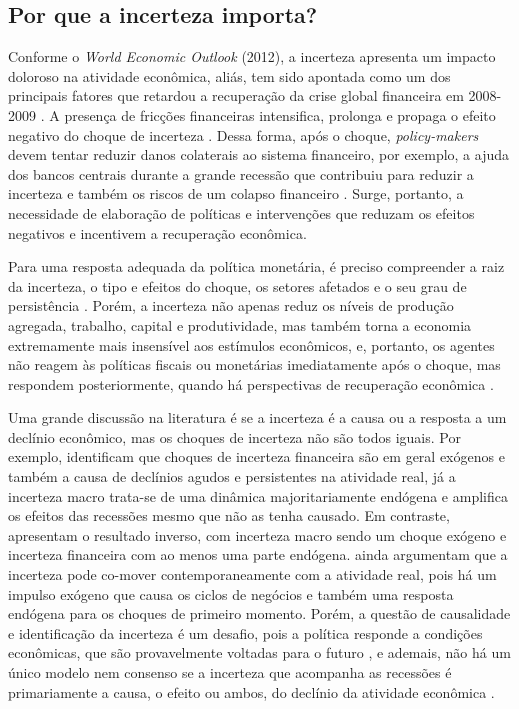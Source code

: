 \subsection{Por que a incerteza importa?}
Conforme o \textit{World Economic Outlook} (2012), a incerteza apresenta um impacto doloroso na atividade econômica, aliás, tem sido apontada como um dos principais fatores que retardou a recuperação da crise global financeira em 2008-2009 \cite{FMI2012outlook}. A presença de fricções financeiras intensifica, prolonga e propaga o efeito negativo do choque de incerteza \cite{alfaro2024friccao}. Dessa forma, após o choque, \textit{policy-makers} devem tentar reduzir danos colaterais ao sistema financeiro, por exemplo, a ajuda dos bancos centrais durante a grande recessão que contribuiu para reduzir a incerteza e também os riscos de um colapso financeiro \cite{bloom2017observations}. Surge, portanto, a necessidade de elaboração de políticas e intervenções que reduzam os efeitos negativos e incentivem a recuperação econômica. 
\par

Para uma resposta adequada da política monetária, é preciso compreender a raiz da incerteza, o tipo e efeitos do choque, os setores afetados e o seu grau de persistência \cite{haddow2013macroeconomic}. Porém, a incerteza não apenas reduz os níveis de produção agregada, trabalho, capital e produtividade, mas também torna a economia extremamente mais insensível aos estímulos econômicos, e, portanto, os agentes não reagem às políticas fiscais ou monetárias imediatamente após o choque, mas respondem posteriormente, quando há perspectivas de recuperação econômica \cite{bloom2009impact}.
\par

Uma grande discussão na literatura é se a incerteza é a causa ou a resposta a um declínio econômico, mas os choques de incerteza não são todos iguais. Por exemplo,  identificam que choques de incerteza financeira são em geral exógenos e também a causa de declínios agudos e persistentes na atividade real, já a incerteza macro trata-se de uma dinâmica majoritariamente endógena e amplifica os efeitos das recessões mesmo que não as tenha causado. Em contraste,  apresentam o resultado inverso, com incerteza macro sendo um choque exógeno e incerteza financeira com ao menos uma parte endógena.  ainda argumentam que a incerteza pode co-mover contemporaneamente com a atividade real, pois há um impulso exógeno que causa os ciclos de negócios e também uma resposta endógena para os choques de primeiro momento. Porém, a questão de causalidade e identificação da incerteza é um desafio, pois a política responde a condições econômicas, que são provavelmente voltadas para o futuro \cite{baker2016measuring}, e ademais, não há um único modelo nem consenso se a incerteza que acompanha as recessões é primariamente a causa, o efeito ou ambos, do declínio da atividade econômica \cite{ludvigson2021uncertainty}.
\par

